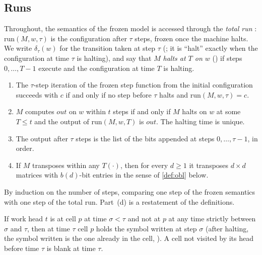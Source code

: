 \subsection{Runs}\label{sec:runs}

Throughout, the semantics of the frozen model is accessed through the \emph{total run}
: $\mathrm{run}(M,w,\tau)$ is the configuration after $\tau$ steps, frozen once the
machine halts. We write $\delta_\tau(w)$ for the transition taken at step $\tau$
(; it is ``halt'' exactly when the configuration at time $\tau$ is halting), and
say that $M$ \emph{halts at $T$ on $w$} () if steps $0,\dots,T-1$ execute and the
configuration at time $T$ is halting.

\begin{lemma}\label{lem:bridge}
\begin{enumerate}[label=(\alph*)]
\item The $\tau$-step iteration of the frozen step function from the initial configuration
succeeds with $c$ if and only if no step before $\tau$ halts and $\mathrm{run}(M,w,\tau)=c$.
\item $M$ computes $\mathit{out}$ on $w$ within $t$ steps if and only if $M$ halts on $w$ at some
$T\le t$ and the output of $\mathrm{run}(M,w,T)$ is $\mathit{out}$. The halting time is unique.
\item The output after $\tau$ steps is the list of the bits appended at steps $0,\dots,\tau-1$, in
order.
\item If $M$ transposes within any $T(\cdot)$, then for every $d\ge1$ it transposes $d\times d$
matrices with $b(d)$-bit entries in the sense of \cref{def:obl} below.
\end{enumerate}
\end{lemma}

\begin{outline}
By induction on the number of steps, comparing one step of the frozen semantics with one step of
the total run. Part~(d) is a restatement of the definitions.
\end{outline}

\begin{lemma}\label{lem:cells}
If work head $t$ is at cell $p$ at time $\sigma<\tau$ and not at $p$ at any time strictly between
$\sigma$ and $\tau$, then at time $\tau$ cell $p$ holds the symbol written at step $\sigma$ (after halting, the symbol
written is the one already in the cell, ). A cell
not visited by its head before time $\tau$ is blank at time $\tau$.
\end{lemma}

